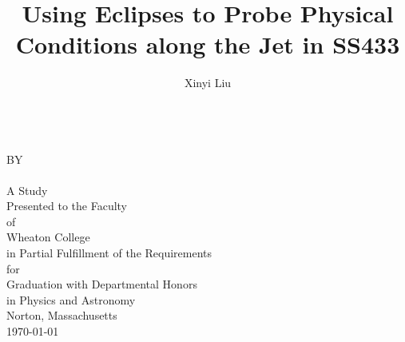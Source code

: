\documentclass[12pt, oneside]{book}
\title{Using Eclipses to Probe Physical Conditions along the Jet in SS433 }
\author{Xinyi Liu}
\begin{document}
  \begin{titlepage}
    \thispagestyle{empty}
    \doublespacing\centering

    \vfill
    \LARGE \textbf{\thetitle{}} \\
    \large BY \\
    \textbf{\theauthor{}} \\

    \vfill
    A Study \\
    Presented to the Faculty \\
    of \\
    Wheaton College \\
    in Partial Fulfillment of the Requirements \\
    for \\
    Graduation with Departmental Honors \\
    in Physics and Astronomy \\
    Norton, Massachusetts \\
    \monthyeardate\today

    \vfill
  \end{titlepage}

  \frontmatter
  
  
  
  \tableofcontents{}
  \mainmatter  %
  
  
  
  
  
  
  
  



  \clearpage{}\label{chap: list of figure}
  \listoffigures
  
  
  \clearpage{}\label{chap: index}
  \printindex
  

  
  
\end{document}

